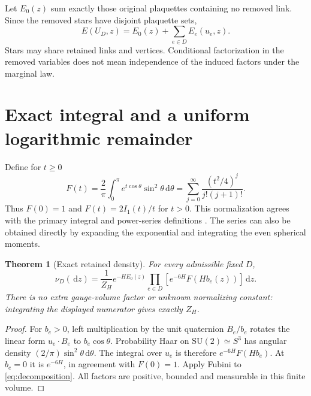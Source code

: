 \documentclass[11pt]{article}
\newtheorem{theorem}{Theorem}[section]
\theoremstyle{definition}
\theoremstyle{remark}
\newcommand{\dd}{\,\mathrm d}
\newcommand{\SU}{\mathrm{SU}(2)}
\begin{document}
Let $E_0(z)$ sum exactly those original plaquettes containing no removed
link. Since the removed stars have disjoint plaquette sets,
\begin{equation}
 E(U_D,z)=E_0(z)+\sum_{e\in D}E_e(u_e,z).
 \label{eq:decomposition}
\end{equation}
Stars may share retained links and vertices. Conditional factorization
in the removed variables does not mean independence of the induced
factors under the marginal law.

\section{Exact integral and a uniform logarithmic remainder}
Define for $t\ge0$
\begin{equation}
 F(t)=\frac2\pi\int_0^\pi e^{t\cos\theta}\sin^2\theta\dd\theta
     =\sum_{j=0}^\infty\frac{(t^2/4)^j}{j!(j+1)!}.
 \label{eq:F}
\end{equation}
Thus $F(0)=1$ and $F(t)=2I_1(t)/t$ for $t>0$. This normalization agrees
with the primary integral and power-series definitions
\cite[10.32.2, 10.25.2]{dlmf}. The series can also be obtained directly
by expanding the exponential and integrating the even spherical moments.

\begin{theorem}[Exact retained density]\label{thm:marginal}
For every admissible fixed $D$,
\begin{equation}
 \nu_D(\dd z)=\frac1{Z_H}e^{-HE_0(z)}
        \prod_{e\in D}\left[e^{-6H}F(Hb_e(z))\right]\dd z.
 \label{eq:exact}
\end{equation}
There is no extra gauge-volume factor or unknown normalizing constant:
integrating the displayed numerator gives exactly $Z_H$.
\end{theorem}
\begin{proof}
For $b_e>0$, left multiplication by the unit quaternion $B_e/b_e$
rotates the linear form $u_e\cdot B_e$ to $b_e\cos\theta$. Probability
Haar on $\SU\simeq S^3$ has angular density
$(2/\pi)\sin^2\theta\dd\theta$. The integral over $u_e$ is therefore
$e^{-6H}F(Hb_e)$. At $b_e=0$ it is $e^{-6H}$, in agreement with
$F(0)=1$. Apply Fubini to \eqref{eq:decomposition}. All factors are
positive, bounded and measurable in this finite volume.
\end{proof}
\end{document}
